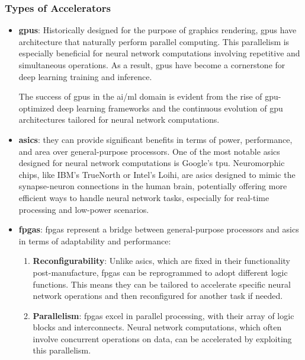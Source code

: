 \subsubsection{Types of Accelerators}
\begin{itemize}
	\item \textbf{\glspl{gpu}}: Historically designed for the purpose of graphics rendering, \glspl{gpu} have architecture that naturally perform parallel computing. This parallelism is especially beneficial for neural network computations involving repetitive and simultaneous operations. As a result, \glspl{gpu} have become a cornerstone for deep learning training and inference.
	
	The success of \glspl{gpu} in the \gls{ai}/\gls{ml} domain is evident from the rise of \gls{gpu}-optimized deep learning frameworks and the continuous evolution of \gls{gpu} architectures tailored for neural network computations.
	
	
	\item \textbf{\glspl{asic}}: they can provide significant benefits in terms of power, performance, and area over general-purpose processors. One of the most notable \glspl{asic} designed for neural network computations is Google's \gls{tpu}. Neuromorphic chips, like IBM's TrueNorth or Intel's Loihi, are \glspl{asic} designed to mimic the synapse-neuron connections in the human brain, potentially offering more efficient ways to handle neural network tasks, especially for real-time processing and low-power scenarios.
	
	\item \textbf{\glspl{fpga}}: \glspl{fpga} represent a bridge between general-purpose processors and \glspl{asic} in terms of adaptability and performance:
	
	\begin{enumerate}
		\item \textbf{Reconfigurability}: Unlike \glspl{asic}, which are fixed in their functionality post-manufacture, \glspl{fpga} can be reprogrammed to adopt different logic functions. This means they can be tailored to accelerate specific neural network operations and then reconfigured for another task if needed.
		
		\item \textbf{Parallelism}: \glspl{fpga} excel in parallel processing, with their array of logic blocks and interconnects. Neural network computations, which often involve concurrent operations on data, can be accelerated by exploiting this parallelism.
		

\end{enumerate}
\end{itemize}
